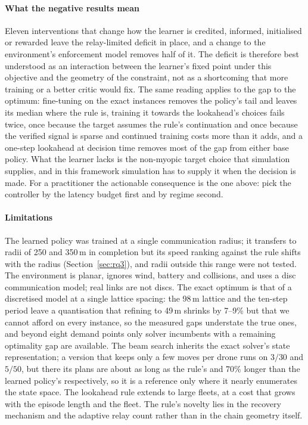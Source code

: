 \documentclass[final,5p,times,twocolumn]{elsarticle}
\begin{document}
\paragraph{What the negative results mean}
Eleven interventions that change how the learner is credited, informed, initialised or rewarded leave
the relay-limited deficit in place, and a change to the environment's enforcement model removes
half of it. The deficit is therefore best understood as an interaction between the learner's
fixed point under this objective and the geometry of the constraint, not as a shortcoming that
more training or a better critic would fix. The same reading applies to the gap to the optimum:
fine-tuning on the exact instances removes the policy's tail and leaves its median where the rule
is, training it towards the lookahead's choices fails twice, once because the target assumes the
rule's continuation and once because the verified signal is sparse and continued training costs
more than it adds, and a one-step lookahead at decision time removes most of the gap from either
base policy. What the learner lacks is the non-myopic target choice that simulation supplies, and
in this framework simulation has to supply it when the decision is made. For a practitioner the
actionable consequence is the one above: pick the controller by the latency budget first and by
regime second.

\paragraph{Limitations}
The learned policy was trained at a single communication radius; it transfers to radii of 250 and
350\,m in completion but its speed ranking against the rule shifts with the radius
(Section~\ref{sec:rq3}), and radii outside this range were not tested. The environment is planar, ignores
wind, battery and collisions, and uses a disc communication model; real links are not discs. The
exact optimum is that of a discretised model at a single lattice spacing: the 98\,m lattice and
the ten-step period leave a quantisation that refining to 49\,m shrinks by 7--9\% but that we
cannot afford on every instance, so the measured gaps understate the true ones, and beyond eight
demand points only solver incumbents with a remaining optimality gap are available. The beam
search inherits the exact solver's state representation; a version that keeps only a few moves per
drone runs on $3/30$ and $5/50$, but there its plans are about as long as the rule's and 70\% longer
than the learned policy's respectively, so it is a reference only where it nearly enumerates the
state space. The lookahead rule extends to large fleets, at a cost that grows with the episode
length and the fleet. The
rule's novelty lies in the recovery mechanism and the adaptive relay count rather than in the
chain geometry itself.
\end{document}
